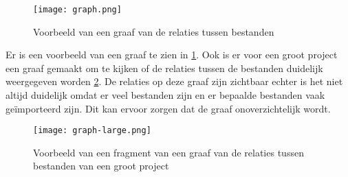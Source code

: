 \begin{figure}[h]
    \centering
    \texttt{[image: graph.png]}
    \caption{Voorbeeld van een graaf van de relaties tussen bestanden}
    \label{fig:graph}
\end{figure}

Er is een voorbeeld van een graaf te zien in \ref{fig:graph}.
Ook is er voor een groot project een graaf gemaakt om te kijken of de relaties tussen de bestanden duidelijk weergegeven worden \ref{fig:graph-large}.
De relaties op deze graaf zijn zichtbaar echter is het niet altijd duidelijk omdat er veel bestanden zijn en er bepaalde bestanden vaak geïmporteerd zijn.
Dit kan ervoor zorgen dat de graaf onoverzichtelijk wordt.

\begin{figure}[h]
    \centering
    \texttt{[image: graph-large.png]}
    \caption{Voorbeeld van een fragment van een graaf van de relaties tussen bestanden van een groot project}
    \label{fig:graph-large}
\end{figure}